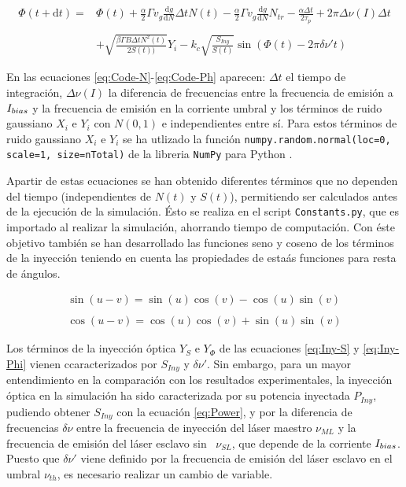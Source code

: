 			\begin{equation}
				\begin{matrix}
					\Phi(t + \mathrm{d}t) =  & \Phi(t) + \frac{\alpha}{2}\Gamma v_g \frac{\mathrm{d}g}{\mathrm{d}N} \Delta t N(t) - \frac{\alpha}{2}\Gamma v_g \frac{\mathrm{d} g}{\mathrm{d}N} N_{tr} - \frac{\alpha\Delta t}{2\tau_p} + 2\pi\Delta\nu(I)\Delta t \\ \\
					& + \sqrt{\frac{\beta \Gamma B \Delta t N^2(t)}{2 S(t))}} Y_i - k_c\sqrt{\frac{S_{Iny}}{S(t)}} \sin(\Phi(t) - 2\pi \delta\nu't)
				\end{matrix}
				\label{eq:Code-Ph}
			\end{equation}

		En las ecuaciones \ref{eq:Code-N}-\ref{eq:Code-Ph} aparecen: $\Delta t$ el tiempo de integraci\'on, $\Delta\nu(I)$ la diferencia de frecuencias entre la frecuencia de emisi\'on a $I_{bias}$ y la frecuencia de emisi\'on en la corriente umbral \cite{Chaves19} y los t\'erminos de ruido gaussiano $X_i$ e $Y_i$ con $N(0, 1)$ e independientes entre s\'i. Para estos t\'erminos de ruido gaussiano $X_i$ e $Y_i$ se ha utlizado la funci\'on \texttt{numpy.random.normal(loc=0, scale=1, size=nTotal)} de la libreria \texttt{NumPy} para Python \cite{numpy}.

		Apartir de estas ecuaciones se han obtenido diferentes t\'erminos que no dependen del tiempo (independientes de $N(t)$ y $S(t)$), permitiendo ser calculados antes de la ejecuci\'on de la simulaci\'on. \'Esto se realiza en el script \texttt{Constants.py}, que es importado al realizar la simulaci\'on, ahorrando tiempo de computaci\'on. Con \'este objetivo tambi\'en se han desarrollado las funciones seno y coseno de los t\'erminos de la inyecci\'on teniendo en cuenta las propiedades de esta\'as funciones para resta de \'angulos.

			\begin{equation}
				\begin{matrix}
					\sin(u - v) = \sin(u)\cos(v) - \cos(u)\sin(v) \\ \\

					\cos(u - v) = \cos(u)\cos(v) + \sin(u)\sin(v) 
				\end{matrix}
			\end{equation}

		Los t\'erminos de la inyecci\'on \'optica $Y_S$ e $Y_{\Phi}$ de las ecuaciones \ref{eq:Iny-S} y \ref{eq:Iny-Phi} vienen ccaracterizados por $S_{Iny}$ y $\delta\nu'$. Sin embargo, para un mayor entendimiento en la comparaci\'on con los resultados experimentales, la inyecci\'on \'optica en la simulaci\'on ha sido caracterizada por su potencia inyectada $P_{Iny}$, pudiendo obtener $S_{Iny}$ con la ecuaci\'on \ref{eq:Power}, y por la diferencia de frecuencias $\delta\nu$ entre la frecuencia de inyecci\'on del l\'aser maestro $\nu_{ML}$ y la frecuencia de emisi\'on del l\'aser esclavo sin \gs\ $\nu_{SL}$, que depende de la corriente $I_{bias}$. Puesto que $\delta\nu'$ viene definido por la frecuencia de emisi\'on del l\'aser esclavo en el umbral $\nu_{th}$, es necesario realizar un cambio de variable.

